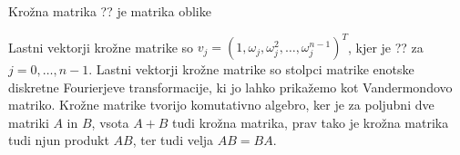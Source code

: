 \documentclass{beamer}
\institute[FMF]{Fakulteta za matematiko in fiziko}
\begin{document}
    Krožna matrika ?? je matrika oblike 

        



        Lastni vektorji krožne matrike so 
        $v_j = (1, \omega_j, \omega_j^2, \ldots, \omega_j^{n-1})^T$, 
        kjer je ?? za $j=0, \ldots, n-1$.
        Lastni vektorji krožne matrike so stolpci matrike enotske diskretne Fourierjeve transformacije, 
        ki jo lahko prikažemo kot Vandermondovo matriko.
        Krožne matrike tvorijo komutativno algebro, ker je za poljubni dve matriki 
        $A$ in $B$, vsota $A + B$ tudi krožna matrika, prav tako je krožna matrika tudi njun produkt 
        $AB$, ter tudi velja $AB = BA$.
\end{document}
